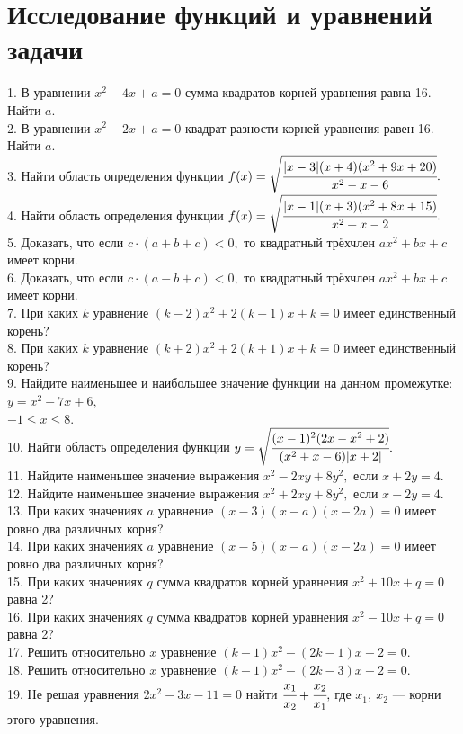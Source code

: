\documentclass[12pt]{article}
\begin{document}
\section{Исследование функций и уравнений задачи}
1. В уравнении $x^2-4x+a=0$ сумма квадратов корней уравнения равна 16. Найти $a.$\\
2. В уравнении $x^2-2x+a=0$ квадрат разности корней уравнения равен 16. Найти $a.$\\
3. Найти область определения функции $f(x)=\sqrt{\cfrac{|x-3|(x+4)(x^2+9x+20)}{x^2-x-6}}.$\\
4. Найти область определения функции $f(x)=\sqrt{\cfrac{|x-1|(x+3)(x^2+8x+15)}{x^2+x-2}}.$\\
5. Доказать, что если $c\cdot(a+b+c)<0,$ то квадратный трёхчлен $ax^2+bx+c$ имеет корни.\\
6. Доказать, что если $c\cdot(a-b+c)<0,$ то квадратный трёхчлен $ax^2+bx+c$ имеет корни.\\
7. При каких $k$ уравнение $(k-2)x^2+2(k-1)x+k=0$ имеет единственный корень?\\
8. При каких $k$ уравнение $(k+2)x^2+2(k+1)x+k=0$ имеет единственный корень?\\
9. Найдите наименьшее и наибольшее значение функции на данном промежутке: $y=x^2-7x+6,$ \\
$-1\le x\le 8.$\\
10. Найти область определения функции $y=\sqrt{\cfrac{(x-1)^2(2x-x^2+2)}{(x^2+x-6)|x+2|}}.$\\
11. Найдите наименьшее значение выражения $x^2-2xy+8y^2,$
если $x+2y=4.$\\
12. Найдите наименьшее значение выражения $x^2+2xy+8y^2,$
если $x-2y=4.$\\
13. При каких значениях $a$ уравнение $(x-3)(x-a)(x-2a)=0$ имеет ровно два различных корня?\\
14. При каких значениях $a$ уравнение $(x-5)(x-a)(x-2a)=0$ имеет ровно два различных корня?\\
15. При каких значениях $q$ сумма квадратов корней уравнения $x^2+10x+q=0$ равна 2?\\
16. При каких значениях $q$ сумма квадратов корней уравнения $x^2-10x+q=0$ равна 2?\\
17. Решить относительно $x$ уравнение $(k-1)x^2-(2k-1)x+2=0.$\\
18. Решить относительно $x$ уравнение $(k-1)x^2-(2k-3)x-2=0.$\\
19. Не решая уравнения $2x^2-3x-11=0$ найти $\cfrac{x_1}{x_2}+\cfrac{x_2}{x_1},$ где $x_1,\ x_2$ --- корни этого уравнения.\\
\end{document}
